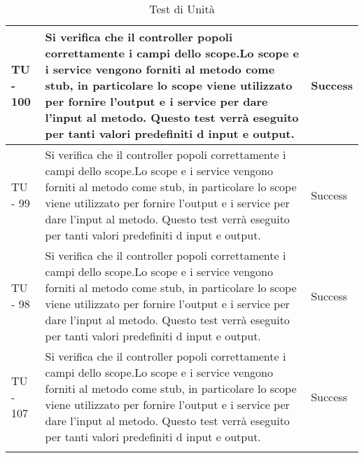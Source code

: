 \begin{center}
\begin{longtable}{ | p{3cm} | p{9cm} | p{2cm} | }
TU - 100 & Si verifica che il controller popoli correttamente i campi dello scope.Lo scope e i service vengono forniti al metodo come stub, in particolare lo scope viene utilizzato per fornire l'output e i service per dare l'input al metodo. Questo test verrà eseguito per tanti valori predefiniti d input e output. & Success \\ \hline
TU - 99 & Si verifica che il controller popoli correttamente i campi dello scope.Lo scope e i service vengono forniti al metodo come stub, in particolare lo scope viene utilizzato per fornire l'output e i service per dare l'input al metodo. Questo test verrà eseguito per tanti valori predefiniti d input e output. & Success \\ \hline
TU - 98 & Si verifica che il controller popoli correttamente i campi dello scope.Lo scope e i service vengono forniti al metodo come stub, in particolare lo scope viene utilizzato per fornire l'output e i service per dare l'input al metodo. Questo test verrà eseguito per tanti valori predefiniti d input e output.
 & Success \\ \hline
TU - 107 & Si verifica che il controller popoli correttamente i campi dello scope.Lo scope e i service vengono forniti al metodo come stub, in particolare lo scope viene utilizzato per fornire l'output e i service per dare l'input al metodo. Questo test verrà eseguito per tanti valori predefiniti d input e output. & Success \\ \hline
\caption{Test di Unità}
\end{longtable}
\egroup
\end{center}
